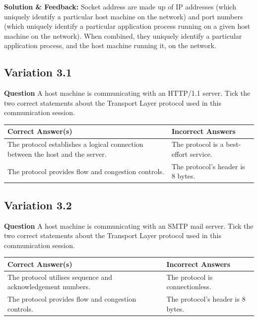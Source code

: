 \textbf{Solution \& Feedback:}
{\color{red}
Socket address are made up of IP addresses (which uniquely identify a particular host machine on the network) and port numbers (which uniquely identify a particular application process running on a given host machine on the network). When combined, they uniquely identify a particular application process, and the host machine running it, on the network. 
}
\subsection{Variation 3.1}
\textbf{Question} A host machine is communicating with an HTTP/1.1 server. Tick the two correct statements about the Transport Layer protocol used in this communication session. \\
\begin{tabularx}{\textwidth}{|X|X|}
    \hline
    \textbf{Correct Answer(s)} & \textbf{Incorrect Answers} \\
    \hline
    The protocol establishes a logical connection between the host and the server. & The protocol is a best-effort service. \\
    The protocol provides flow and congestion controls. & The protocol's header is 8 bytes. \\
    \hline
\end{tabularx}

\subsection{Variation 3.2}
\textbf{Question} A host machine is communicating with an SMTP mail server. Tick the two correct statements about the Transport Layer protocol used in this communication session. \\
\begin{tabularx}{\textwidth}{|X|X|}
    \hline
    \textbf{Correct Answer(s)} & \textbf{Incorrect Answers} \\
    \hline
    The protocol utilises sequence and acknowledgement numbers. & The protocol is connectionless. \\
    The protocol provides flow and congestion controls. & The protocol's header is 8 bytes. \\
    \hline
\end{tabularx}

